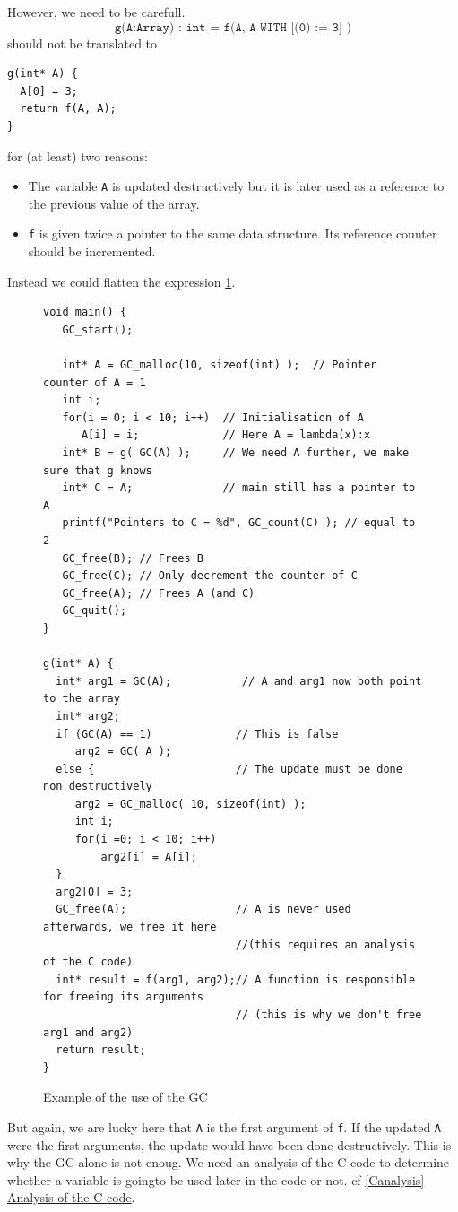 \documentclass[12pt,a4paper,titlepage]{article}
\newcommand{\cl}[1]{\texttt{#1}}
\begin{document}
However, we need to be carefull.
$$ \cl{g(A:Array) : int = f(A, A WITH [(0) := 3] )}$$
should not be translated to
\begin{lstlisting}
g(int* A) {
  A[0] = 3;
  return f(A, A);
}
\end{lstlisting}
for (at least) two reasons:
\begin{itemize}
\item The variable \cl{A} is updated destructively but it is later used as a reference to the previous value of the array.
\item \cl{f} is given twice a pointer to the same data structure. Its reference counter should be incremented.
\end{itemize}

Instead we could flatten the expression \ref{fig:exampleGC}.

\begin{figure}[h!]
\begin{lstlisting}
void main() {
   GC_start();
   
   int* A = GC_malloc(10, sizeof(int) );  // Pointer counter of A = 1
   int i;
   for(i = 0; i < 10; i++)  // Initialisation of A
      A[i] = i;             // Here A = lambda(x):x
   int* B = g( GC(A) );     // We need A further, we make sure that g knows
   int* C = A;              // main still has a pointer to A
   printf("Pointers to C = %d", GC_count(C) ); // equal to 2
   GC_free(B); // Frees B
   GC_free(C); // Only decrement the counter of C
   GC_free(A); // Frees A (and C)
   GC_quit();
}

g(int* A) {
  int* arg1 = GC(A);           // A and arg1 now both point to the array
  int* arg2;
  if (GC(A) == 1)             // This is false
     arg2 = GC( A );
  else {                      // The update must be done non destructively
     arg2 = GC_malloc( 10, sizeof(int) );
     int i;
     for(i =0; i < 10; i++)
         arg2[i] = A[i];
  }  
  arg2[0] = 3;
  GC_free(A);                 // A is never used afterwards, we free it here
                              //(this requires an analysis of the C code)
  int* result = f(arg1, arg2);// A function is responsible for freeing its arguments
                              // (this is why we don't free arg1 and arg2)
  return result;
}
\end{lstlisting}
\caption{Example of the use of the GC}
\label{fig:exampleGC}
\end{figure}


But again, we are lucky here that \cl{A} is the first argument of \cl{f}. If the updated \cl{A} were the first arguments, the update would have been done destructively.
This is why the GC alone is not enoug. We need an analysis of the C code to determine whether a variable is goingto be used later in the code or not. cf \hyperref[Canalysis]{\ref*{Canalysis} Analysis of the C code}.
\end{document}
